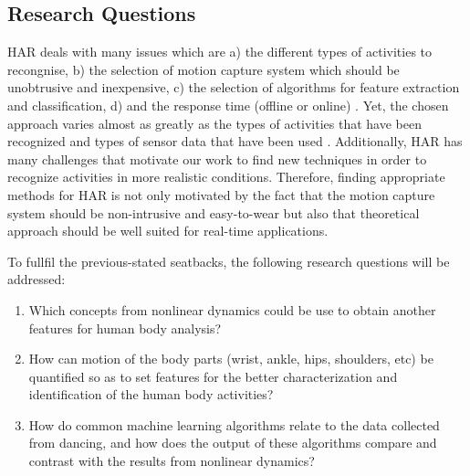 \documentclass{sigchi}
\begin{document}
\subsection{Research Questions}
HAR deals with many issues which are
a) the different types of activities to recongnise,
b) the selection of motion capture system which should be unobtrusive and inexpensive,
c) the selection of algorithms for feature extraction and classification,
d) and the response time (offline or online) \cite{Lara2013}.
Yet, the chosen approach varies almost as greatly as the types of activities 
that have been recognized and types of sensor data that have been used 
\cite{Kim2010}. 
Additionally, HAR has many challenges that motivate our work 
to find new techniques in order to recognize activities in more realistic conditions. 
Therefore, finding appropriate methods for HAR is not only motivated by the 
fact that the motion capture system should be non-intrusive and easy-to-wear
but also that theoretical approach should be well suited for real-time applications.

To fullfil the previous-stated seatbacks, the following research questions will be addressed:

\begin{enumerate}
  \setlength{\itemsep}{0pt}
  \setlength{\parsep}{0pt}
  \item Which concepts from nonlinear dynamics could be use to obtain 
	another features for human body analysis?
  \item How can motion of the body parts (wrist, ankle, hips, shoulders, etc)
        be quantified so as to set features for the better characterization
        and identification of the human body activities?
  \item How do common machine learning algorithms relate to the data collected 
  from dancing, and how does the output of these algorithms compare and contrast 
  with the results from nonlinear dynamics?
\end{enumerate}
\end{document}
